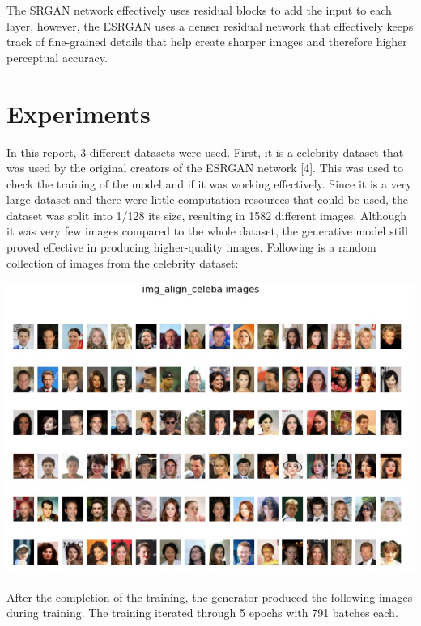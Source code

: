 \documentclass{article}
\begin{document}
The SRGAN network effectively uses residual blocks to add the input to each layer, however, the ESRGAN uses a denser residual network that effectively keeps track of fine-grained details that help create sharper images and therefore higher perceptual accuracy. 


\section{Experiments}

In this report, 3 different datasets were used. First, it is a celebrity dataset that was used by the original creators of the ESRGAN network [4]. This was used to check the training of the model and if it was working effectively. Since it is a very large dataset and there were little computation resources that could be used, the dataset was split into 1/128 its size, resulting in 1582 different images. Although it was very few images compared to the whole dataset, the generative model still proved effective in producing higher-quality images. Following is a random collection of images from the celebrity dataset:

\begin{center}
\includegraphics[scale=0.5]{images/img_align_celeba_images.jpg}
\end{center}

After the completion of the training, the generator produced the following images during training. The training iterated through 5 epochs with 791 batches each.
\end{document}
